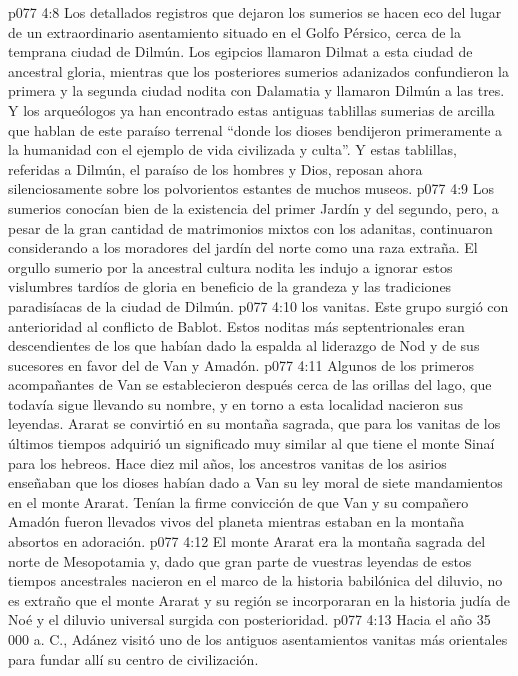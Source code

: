 \vs p077 4:8 Los detallados registros que dejaron los sumerios se hacen eco del lugar de un extraordinario asentamiento situado en el Golfo Pérsico, cerca de la temprana ciudad de Dilmún. Los egipcios llamaron Dilmat a esta ciudad de ancestral gloria, mientras que los posteriores sumerios adanizados confundieron la primera y la segunda ciudad nodita con Dalamatia y llamaron Dilmún a las tres. Y los arqueólogos ya han encontrado estas antiguas tablillas sumerias de arcilla que hablan de este paraíso terrenal “donde los dioses bendijeron primeramente a la humanidad con el ejemplo de vida civilizada y culta”. Y estas tablillas, referidas a Dilmún, el paraíso de los hombres y Dios, reposan ahora silenciosamente sobre los polvorientos estantes de muchos museos.
\vs p077 4:9 Los sumerios conocían bien de la existencia del primer Jardín y del segundo, pero, a pesar de la gran cantidad de matrimonios mixtos con los adanitas, continuaron considerando a los moradores del jardín del norte como una raza extraña. El orgullo sumerio por la ancestral cultura nodita les indujo a ignorar estos vislumbres tardíos de gloria en beneficio de la grandeza y las tradiciones paradisíacas de la ciudad de Dilmún.
\vs p077 4:10  los vanitas. Este grupo surgió con anterioridad al conflicto de Bablot. Estos noditas más septentrionales eran descendientes de los que habían dado la espalda al liderazgo de Nod y de sus sucesores en favor del de Van y Amadón.
\vs p077 4:11 \pc Algunos de los primeros acompañantes de Van se establecieron después cerca de las orillas del lago, que todavía sigue llevando su nombre, y en torno a esta localidad nacieron sus leyendas. Ararat se convirtió en su montaña sagrada, que para los vanitas de los últimos tiempos adquirió un significado muy similar al que tiene el monte Sinaí para los hebreos. Hace diez mil años, los ancestros vanitas de los asirios enseñaban que los dioses habían dado a Van su ley moral de siete mandamientos en el monte Ararat. Tenían la firme convicción de que Van y su compañero Amadón fueron llevados vivos del planeta mientras estaban en la montaña absortos en adoración.
\vs p077 4:12 El monte Ararat era la montaña sagrada del norte de Mesopotamia y, dado que gran parte de vuestras leyendas de estos tiempos ancestrales nacieron en el marco de la historia babilónica del diluvio, no es extraño que el monte Ararat y su región se incorporaran en la historia judía de Noé y el diluvio universal surgida con posterioridad.
\vs p077 4:13 Hacia el año 35\,000 a. C., Adánez visitó uno de los antiguos asentamientos vanitas más orientales para fundar allí su centro de civilización.

